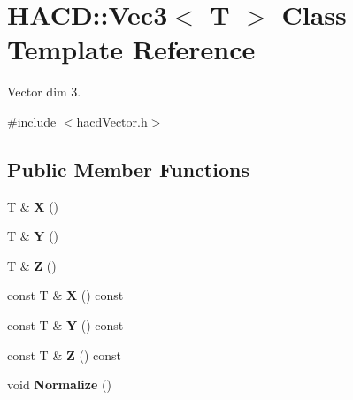 \hypertarget{class_h_a_c_d_1_1_vec3}{\section{H\+A\+C\+D\+:\+:Vec3$<$ T $>$ Class Template Reference}
\label{class_h_a_c_d_1_1_vec3}
}


Vector dim 3.  




{\ttfamily \#include $<$hacd\+Vector.\+h$>$}

\subsection*{Public Member Functions}
\begin{DoxyCompactItemize}
\item 
\hypertarget{class_h_a_c_d_1_1_vec3_a237c6c8e8e17ceea9baad0753899ad61}{T \& {\bfseries X} ()}\label{class_h_a_c_d_1_1_vec3_a237c6c8e8e17ceea9baad0753899ad61}

\item 
\hypertarget{class_h_a_c_d_1_1_vec3_a8e251b079fa8d1b3206c4c8bba5f1528}{T \& {\bfseries Y} ()}\label{class_h_a_c_d_1_1_vec3_a8e251b079fa8d1b3206c4c8bba5f1528}

\item 
\hypertarget{class_h_a_c_d_1_1_vec3_abb17e95e4f8b954d1a548d481b60108e}{T \& {\bfseries Z} ()}\label{class_h_a_c_d_1_1_vec3_abb17e95e4f8b954d1a548d481b60108e}

\item 
\hypertarget{class_h_a_c_d_1_1_vec3_aea4c532d8aeba16aac4a5eb74c4e80f6}{const T \& {\bfseries X} () const }\label{class_h_a_c_d_1_1_vec3_aea4c532d8aeba16aac4a5eb74c4e80f6}

\item 
\hypertarget{class_h_a_c_d_1_1_vec3_a4f2dad93219a68da46edae66722f5b31}{const T \& {\bfseries Y} () const }\label{class_h_a_c_d_1_1_vec3_a4f2dad93219a68da46edae66722f5b31}

\item 
\hypertarget{class_h_a_c_d_1_1_vec3_a216073bb991f5177345a32833d3e1548}{const T \& {\bfseries Z} () const }\label{class_h_a_c_d_1_1_vec3_a216073bb991f5177345a32833d3e1548}

\item 
\hypertarget{class_h_a_c_d_1_1_vec3_a05f3f52bb74e02b6669488b32687ee92}{void {\bfseries Normalize} ()}\label{class_h_a_c_d_1_1_vec3_a05f3f52bb74e02b6669488b32687ee92}


\end{DoxyCompactItemize}
